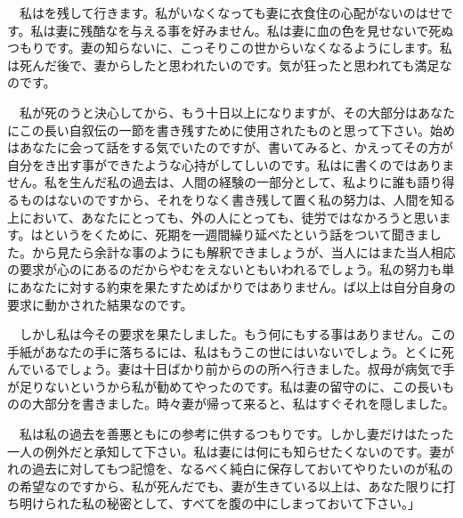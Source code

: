 \documentclass[a4j,onecolumn]{tarticle}
\begin{document}
　私はを残して行きます。\hbox{}私がいなくなっても妻に衣食住の心配がないのはせです。\hbox{}私は妻に残酷なを与える事を好みません。\hbox{}私は妻に血の色を見せないで死ぬつもりです。\hbox{}妻の知らないに、\hbox{}こっそりこの世からいなくなるようにします。\hbox{}私は死んだ後で、\hbox{}妻からしたと思われたいのです。\hbox{}気が狂ったと思われても満足なのです。\hbox{}\par{}
　私が死のうと決心してから、\hbox{}もう十日以上になりますが、\hbox{}その大部分はあなたにこの長い自叙伝の一節を書き残すために使用されたものと思って下さい。\hbox{}始めはあなたに会って話をする気でいたのですが、\hbox{}書いてみると、\hbox{}かえってその方が自分をき出す事ができたような心持がしてしいのです。\hbox{}私はに書くのではありません。\hbox{}私を生んだ私の過去は、\hbox{}人間の経験の一部分として、\hbox{}私よりに誰も語り得るものはないのですから、\hbox{}それをりなく書き残して置く私の努力は、\hbox{}人間を知る上において、\hbox{}あなたにとっても、\hbox{}外の人にとっても、\hbox{}徒労ではなかろうと思います。\hbox{}はというをくために、\hbox{}死期を一週間繰り延べたという話をついて聞きました。\hbox{}から見たら余計な事のようにも解釈できましょうが、\hbox{}当人にはまた当人相応の要求が心のにあるのだからやむをえないともいわれるでしょう。\hbox{}私の努力も単にあなたに対する約束を果たすためばかりではありません。\hbox{}ば以上は自分自身の要求に動かされた結果なのです。\hbox{}\par{}
　しかし私は今その要求を果たしました。\hbox{}もう何にもする事はありません。\hbox{}この手紙があなたの手に落ちるには、\hbox{}私はもうこの世にはいないでしょう。\hbox{}とくに死んでいるでしょう。\hbox{}妻は十日ばかり前からのの所へ行きました。\hbox{}叔母が病気で手が足りないというから私が勧めてやったのです。\hbox{}私は妻の留守のに、\hbox{}この長いものの大部分を書きました。\hbox{}時々妻が帰って来ると、\hbox{}私はすぐそれを隠しました。\hbox{}\par{}
　私は私の過去を善悪ともにの参考に供するつもりです。\hbox{}しかし妻だけはたった一人の例外だと承知して下さい。\hbox{}私は妻には何にも知らせたくないのです。\hbox{}妻がれの過去に対してもつ記憶を、\hbox{}なるべく純白に保存しておいてやりたいのが私のの希望なのですから、\hbox{}私が死んだでも、\hbox{}妻が生きている以上は、\hbox{}あなた限りに打ち明けられた私の秘密として、\hbox{}すべてを腹の中にしまっておいて下さい。\hbox{}」\par{}\par{}\par{}\par{}
\end{document}
